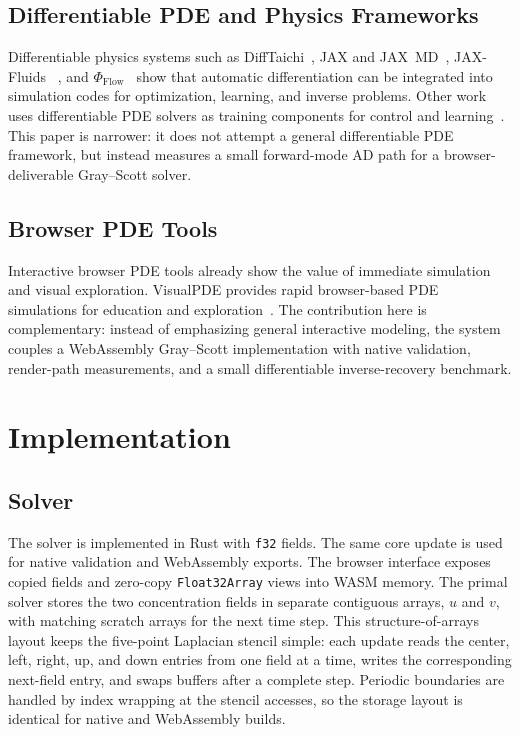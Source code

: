 \documentclass[journal]{IEEEtran}
\begin{document}
\subsection{Differentiable PDE and Physics Frameworks}
Differentiable physics systems such as DiffTaichi~\cite{hu2020difftaichi},
JAX and JAX~MD~\cite{bradbury2018jax,schoenholz2021jaxmd}, JAX-Fluids
~\cite{bezgin2023jaxfluids,bezgin2025jaxfluids2}, and
\(\Phi_{\mathrm{Flow}}\)~\cite{holl2024phiflow} show that automatic
differentiation can be integrated into simulation codes for optimization,
learning, and inverse problems. Other work uses differentiable PDE solvers as
training components for control and learning~\cite{holl2020controlpdes,
um2020solverloop,raissi2019pinns}. This paper is narrower: it does not attempt a
general differentiable PDE framework, but instead measures a small
forward-mode AD path for a browser-deliverable Gray--Scott solver.

\subsection{Browser PDE Tools}
Interactive browser PDE tools already show the value of immediate simulation and
visual exploration. VisualPDE provides rapid browser-based PDE simulations for
education and exploration~\cite{walker2023visualpde}. The contribution here is
complementary: instead of emphasizing general interactive modeling, the system
couples a WebAssembly Gray--Scott implementation with native validation,
render-path measurements, and a small differentiable inverse-recovery benchmark.

\section{Implementation}
\subsection{Solver}
The solver is implemented in Rust with \texttt{f32} fields. The same core update
is used for native validation and WebAssembly exports. The browser interface
exposes copied fields and zero-copy \texttt{Float32Array} views into WASM memory.
The primal solver stores the two concentration fields in separate contiguous
arrays, \(u\) and \(v\), with matching scratch arrays for the next time step.
This structure-of-arrays layout keeps the five-point Laplacian stencil simple:
each update reads the center, left, right, up, and down entries from one field
at a time, writes the corresponding next-field entry, and swaps buffers after a
complete step. Periodic boundaries are handled by index wrapping at the stencil
accesses, so the storage layout is identical for native and WebAssembly builds.
\end{document}
